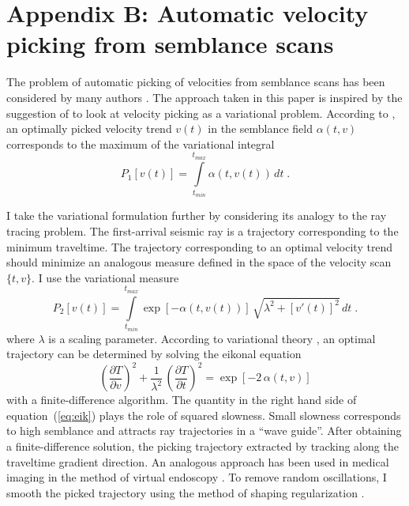 
\appendix
\section{Appendix B: Automatic velocity picking from semblance scans}

The problem of automatic picking of velocities from semblance scans
has been considered by many authors
\cite[]{SEG-1999-11621165,SEG-2003-20882091,SEG-2004-16271629}. The
approach taken in this paper is inspired by the suggestion of
\cite{harlan} to look at velocity picking as a variational
problem. According to \cite{harlan}, an optimally picked velocity trend
$v(t)$ in the semblance field $\alpha(t,v)$ corresponds to the maximum
of the variational integral
\begin{equation}
P_1[v(t)] = \int\limits_{t_{min}}^{t_{max}} \alpha\left(t,v(t)\right)\,d t\;.
\end{equation}

I take the variational formulation further by considering its
analogy to the ray tracing problem. The first-arrival seismic
ray is a trajectory corresponding to the minimum traveltime. The
trajectory corresponding to an optimal velocity trend should minimize
an analogous measure defined in the space of the velocity
scan~$\{t,v\}$. I use the variational measure
\begin{equation}
P_2[v(t)] = \int\limits_{t_{min}}^{t_{max}}
\exp[-\alpha\left(t,v(t)\right)]\,\sqrt{\lambda^2+\left[v'(t)\right]^2}\,d t\;.
\end{equation}
where $\lambda$ is a scaling parameter. According to  variational theory
\cite[]{lanc}, an optimal trajectory can be determined by solving the eikonal equation
\begin{equation}
\label{eq:eik}
\left(\frac{\partial T}{\partial v}\right)^2 + 
\frac{1}{\lambda^2}\,\left(\frac{\partial T}{\partial t}\right)^2 = 
\exp[-2\,\alpha\left(t,v\right)]
\end{equation}
with a finite-difference algorithm. The quantity in the right hand
side of equation~(\ref{eq:eik}) plays the role of squared slowness.
Small slowness corresponds to high semblance and attracts ray
trajectories in a ``wave guide''. After obtaining a finite-difference
solution, the picking trajectory   extracted by
tracking  along the traveltime gradient direction. An
analogous approach has been used in medical imaging in the method of
virtual endoscopy \cite[]{thomas}.  To remove random oscillations, I
smooth the picked trajectory using the method of shaping
regularization
\cite[]{shape}.



